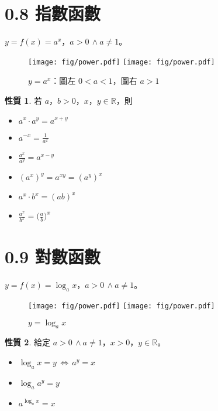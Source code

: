 \documentclass[12pt]{extarticle}
\newcommand{\ds}{\displaystyle}
\newcommand{\ifff}{\,\Longleftrightarrow\,}
\theoremstyle{definition}
\newtheorem*{prp}{性質}
\begin{document}
\section*{0.8 指數函數}

$y = f(x) = a^x$，$a > 0\,\wedge a\not=1$。

\begin{figure}[!htbp]
  \centering
  \texttt{[image: fig/power.pdf]}
  \texttt{[image: fig/power.pdf]}
  \caption{$y = a^x$：圖左 $0 < a < 1$，圖右 $a > 1$}
\end{figure}

\begin{prp} 若 $a$，$b > 0$，$x$，$y\in\mathbb{R}$，則
  \begin{itemize}\setlength\itemsep{0em}
    \item $\ds a^x\cdot a^y = a^{x + y}$
    \item $\ds a^{-x} = \frac{1}{a^x}$
    \item $\ds\frac{a^x}{a^y} = a^{x - y}$
    \item $\ds (a^x)^y = a^{xy} = (a^y)^x$
    \item $\ds a^x\cdot b^x = (ab)^x$
    \item $\ds\frac{a^x}{b^x} = \Big(\frac{a}{b}\Big)^x$
  \end{itemize}
\end{prp}

\section*{0.9 對數函數}

$y = f(x) = \log_a x$，$a > 0\,\wedge a\not=1$。

\begin{figure}[!htbp]
  \centering
  \texttt{[image: fig/power.pdf]}
  \texttt{[image: fig/power.pdf]}
  \caption{$y = \log_a x$}
\end{figure}

\begin{prp} 給定 $a > 0\,\wedge a\not=1$，$x > 0$，$y\in\mathbb{R}$。
  \begin{itemize}\setlength\itemsep{0em}
    \item $\log_a x = y \ifff a^y = x$
    \item $\ds\log_a a^y = y$
    \item $\ds a^{\log_a x} = x$
  \end{itemize}
\end{prp}
\end{document}
